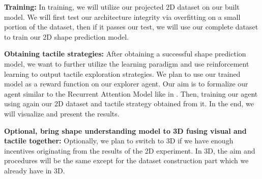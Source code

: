 \documentclass[conference]{IEEEtran}
\begin{document}
\textbf{Training:} In training, we will utilize our projected 2D dataset on our built model. We will first test our architecture integrity via overfitting on a small portion of the dataset, then if it passes our test, we will use our complete dataset to train our 2D shape prediction model. 

\textbf{Obtaining tactile strategies:} After obtaining a successful shape prediction model, we want to further utilize the learning paradigm and use reinforcement learning to output tactile exploration strategies. We plan to use our trained model as a reward function on our explorer agent. Our aim is to formalize our agent similar to the Recurrent Attention Model like in \cite{Fleer2020}. Then, training our agent using again our 2D dataset and tactile strategy obtained from it. In the end, we will visualize and present the results.

\textbf{Optional, bring shape understanding model to 3D fusing visual and tactile together:} Optionally, we plan to switch to 3D if we have enough incentives originating from the results of the 2D experiment. In 3D, the aim and procedures will be the same except for the dataset construction part which we already have in 3D.



\end{document}
